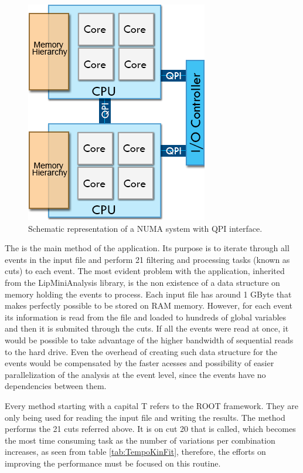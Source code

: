 \begin{figure}[!htp]
	\begin{center}
		\includegraphics[scale=0.5]{../../common/img/numa_qpi.png}
		\caption{Schematic representation of a NUMA system with QPI interface.}
		\label{fig:CallgraphOriginal}
	\end{center}
\end{figure}

The \ttLoop is the main method of the application. Its purpose is to iterate through all events in the input file and perform 21 filtering and processing tasks (known as cuts) to each event. The most evident problem with the application, inherited from the LipMiniAnalysis library, is the non existence of a data structure on memory holding the events to process. Each input file has around 1 GByte that makes perfectly possible to be stored on RAM memory. However, for each event its information is read from the file and loaded to hundreds of global variables and then it is submited through the cuts. If all the events were read at once, it would be possible to take advantage of the higher bandwidth of sequential reads to the hard drive. Even the overhead of creating such data structure for the events would be compensated by the faster acesses and possibility of easier parallelization of the analysis at the event level, since the events have no dependencies between them.

Every method starting with a capital T refers to the ROOT framework. They are only being used for reading the input file and writing the results. The \ttDoCuts method performs the 21 cuts referred above. It is on cut 20 that \ttDilepKinFit is called, which becomes the most time consuming task as the number of variations per combination increases, as seen from table \ref{tab:TempoKinFit}, therefore, the efforts on improving the performance must be focused on this routine.

